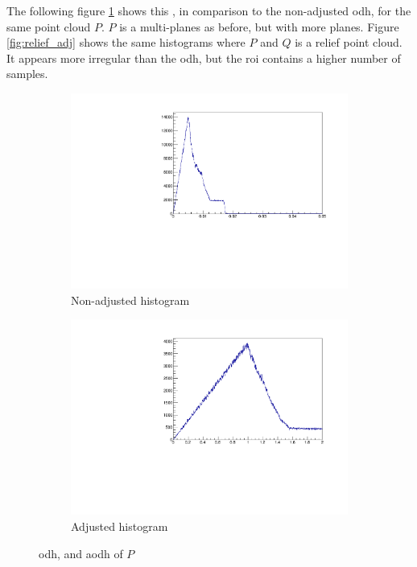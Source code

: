 The following figure \ref{fig:disks_adj} shows this , in comparison to the non-adjusted \gls{odh}, for the same point cloud $P$. $P$ is a multi-planes as before, but with more planes. Figure \ref{fig:relief_adj} shows the same histograms where $P$ and $Q$ is a relief point cloud. It appears more irregular than the \gls{odh}, but the \gls{roi} contains a higher number of samples.
\begin{figure}[H]
\hspace*{\fill}%
\begin{subfigure}{.4\textwidth}
	\includegraphics[width=\linewidth]{fig/disks_noadj.pdf}
	\caption{Non-adjusted histogram}
\end{subfigure}%
\hfill{}%
\begin{subfigure}{.4\textwidth}
	\includegraphics[width=\linewidth]{fig/disks_adj.pdf}
	\caption{Adjusted histogram}
\end{subfigure}
\hspace*{\fill}%
\caption{\Gls{odh}, and \gls{aodh} of $P$}
\label{fig:disks_adj}
\end{figure}

